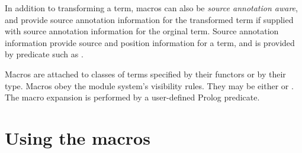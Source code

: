 In addition to transforming a term, macros can also be {\it source annotation
 aware}, and provide source annotation information for the transformed term if
supplied with source annotation information for the orginal term.  Source annotation
 information provide source and position information for a term, and is
provided by predicate such as
 .

Macros are attached to classes of terms specified by their functors
or by their type.
Macros obey the module system's visibility rules.
They may be either
or
.
The macro expansion is performed by a user-defined Prolog predicate.


\section{Using the macros}
\label{usingmacros}

